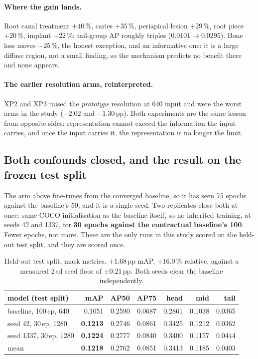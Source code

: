 \documentclass[11pt,letterpaper]{article}
\begin{document}
\paragraph{Where the gain lands.} Root canal treatment $+40$\,\%, caries
$+35$\,\%, periapical lesion $+29$\,\%, root piece $+20$\,\%, implant
$+22$\,\%; tail-group AP roughly triples ($0.0101\to0.0295$). Bone loss moves
$-25$\,\%, the honest exception, and an informative one: it is a large diffuse
region, not a small finding, so the mechanism predicts no benefit there and
none appears.

\paragraph{The earlier resolution arms, reinterpreted.} XP2 and XP3 raised
the \emph{prototype} resolution at 640 input and were the worst arms in the
study ($-2.02$ and $-1.30$\,pp). Both experiments are the same lesson from
opposite sides: representation cannot exceed the information the input
carries, and once the input carries it, the representation is no longer the
limit.

\subsection{Both confounds closed, and the result on the frozen test split}

The arm above fine-tunes from the converged baseline, so it has seen 75 epochs
against the baseline's 50, and it is a single seed. Two replicates close both
at once: same COCO initialisation as the baseline itself, so no inherited
training, at seeds 42 and 1337, for \textbf{30 epochs against the contractual
baseline's 100}. Fewer epochs, not more. These are the only runs in this study
scored on the held-out test split, and they are scored once.

\begin{table}[h]
\centering\small
\begin{tabular}{lrrrrrr}
\toprule
model (test split) & mAP & AP50 & AP75 & head & mid & tail \\
\midrule
baseline, 100\,ep, 640 & 0.1051 & 0.2590 & 0.0687 & 0.2861 & 0.1038 & 0.0365 \\
seed 42, 30\,ep, 1280 & \textbf{0.1213} & 0.2746 & 0.0861 & 0.3425 & 0.1212 & 0.0362 \\
seed 1337, 30\,ep, 1280 & \textbf{0.1224} & 0.2777 & 0.0840 & 0.3400 & 0.1157 & 0.0444 \\
\midrule
mean & \textbf{0.1218} & 0.2762 & 0.0851 & 0.3413 & 0.1185 & 0.0403 \\
\bottomrule
\end{tabular}
\caption{Held-out test split, mask metrics. $+1.68$\,pp mAP, $+16.0$\,\%
relative, against a measured 2\,sd seed floor of $\pm0.21$\,pp. Both seeds
clear the baseline independently.}
\end{table}
\end{document}
